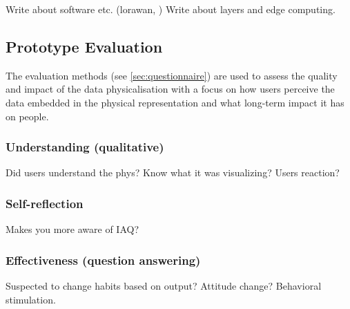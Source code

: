 Write about software etc. (lorawan, ) Write about layers and edge computing. 

\subsection{Prototype Evaluation}

The evaluation methods (see \ref{sec:questionnaire}) are used to assess the quality and impact of the data physicalisation with a focus on how users perceive the data embedded in the physical representation and what long-term impact it has on people.

\subsubsection{Understanding (qualitative)}

Did users understand the phys? Know what it was visualizing? Users reaction?

\subsubsection{Self-reflection}

Makes you more aware of IAQ?

\subsubsection{Effectiveness (question answering)}

Suspected to change habits based on output? Attitude change? Behavioral stimulation.



